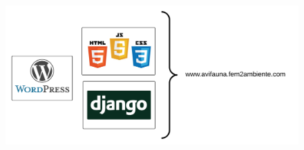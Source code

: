 \documentclass{beamer}
\begin{document}
\begin{frame}
 \begin{center}
  \begin{figure}
    \includegraphics[scale=0.35]{images/conclusione}
  \end{figure} 
 \end{center}
\end{frame}
\end{document}

